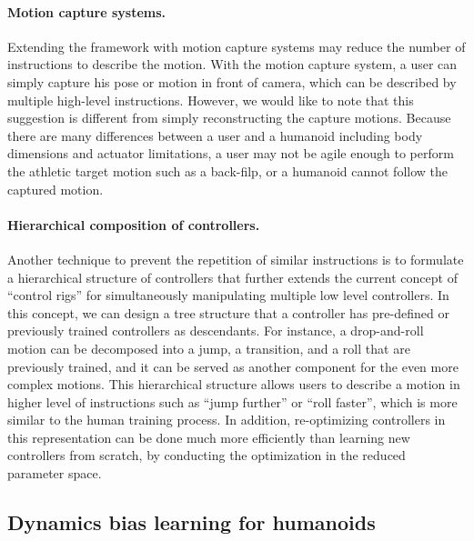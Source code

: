 \paragraph{Motion capture systems.}
Extending the framework with motion capture systems may reduce the number of
instructions to describe the motion.
With the motion capture system, a user can simply capture his pose or motion in
front of camera, which can be described by multiple high-level instructions.
However, we would like to note that this suggestion is different from simply
reconstructing the capture motions.
Because there are many differences between a user and a humanoid including body
dimensions and actuator limitations, a user may not
be agile enough to perform the athletic target motion such as a back-filp, or
a humanoid cannot follow the captured motion.

\paragraph{Hierarchical composition of controllers.}
Another technique to prevent the repetition of similar instructions is to
formulate a hierarchical structure of controllers that further extends the
current concept of ``control rigs'' for simultaneously manipulating multiple
low level controllers.
In this concept, we can design a tree structure that a controller has
pre-defined or previously trained controllers as descendants.
For instance, a drop-and-roll motion can be decomposed into a jump, a
transition, and a roll that are previously trained, and
it can be served as another component for the even more complex motions.
This hierarchical structure allows users to describe a motion in higher level
of instructions such as ``jump further'' or ``roll faster'', which is more
similar to the human training process. 
In addition, re-optimizing controllers in this representation can be done much
more efficiently than learning new controllers from scratch, by conducting the
optimization in the reduced parameter space.

\subsection{Dynamics bias learning for humanoids} 

